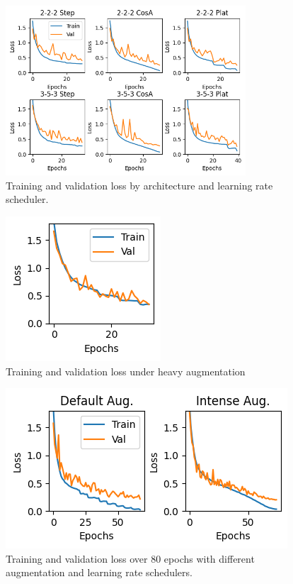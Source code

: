 \documentclass[letterpaper]{article} %
\begin{document}
\begin{figure}[t]
\centering
\includegraphics[width=0.8\textwidth]{experiment-lrschedule-2x3}
\caption{Training and validation loss by architecture and learning rate scheduler.}
\label{fig3}
\end{figure}

\begin{figure}[t]
\centering
\includegraphics[width=0.55\columnwidth]{experiment-heavy-aug}
\caption{Training and validation loss under heavy augmentation}
\label{fig4}
\end{figure}

\begin{figure}[t]
\includegraphics[width=0.98\columnwidth]{experiment-80epoch-augtypes}
\caption{Training and validation loss over 80 epochs with different augmentation and learning rate schedulers.}
\label{fig5}
\end{figure}
\end{document}

